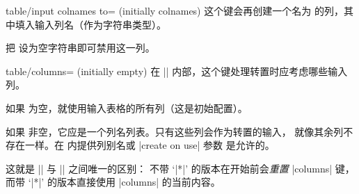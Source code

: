 \documentclass[a4paper,doc2]{ltxdoc}
\begin{document}
\begin{commandlist}
\begin{pgfplotskey}{table/input colnames to= (initially colnames)}
        这个键会再创建一个名为  的列，其中填入输入列名（作为字符串类型）。
\begin{codeexample}[]
\pgfplotstabletranspose[input colnames to=Input]
\loadedtable
\end{codeexample}
        把  设为空字符串即可禁用这一列。
\begin{codeexample}[]
\pgfplotstabletranspose[input colnames to=]
\loadedtable
\end{codeexample}
    \end{pgfplotskey}

    \begin{pgfplotskey}{table/columns= (initially empty)}
        在 |\pgfplotstabletranspose| 内部，这个键处理转置时应考虑哪些输入列。

        如果  为空，就使用输入表格的所有列（这是初始配置）。

        如果  非空，它应是一个列名列表。只有这些列会作为转置的输入，
        就像其余列不存在一样。在  内提供列别名或 |create on use| 参数
        是允许的。
\begin{codeexample}[]
\pgfplotstabletranspose[columns={a,b}]
\loadedtable
\end{codeexample}

        这就是 |\pgfplotstabletranspose| 与 |\pgfplotstabletranspose*| 之间唯一的区别：
        不带 `|*|' 的版本在开始前会\emph{重置} |columns| 键，而带 `|*|' 的版本直接使用
        |columns| 的当前内容。
    \end{pgfplotskey}
\end{commandlist}
\end{document}
